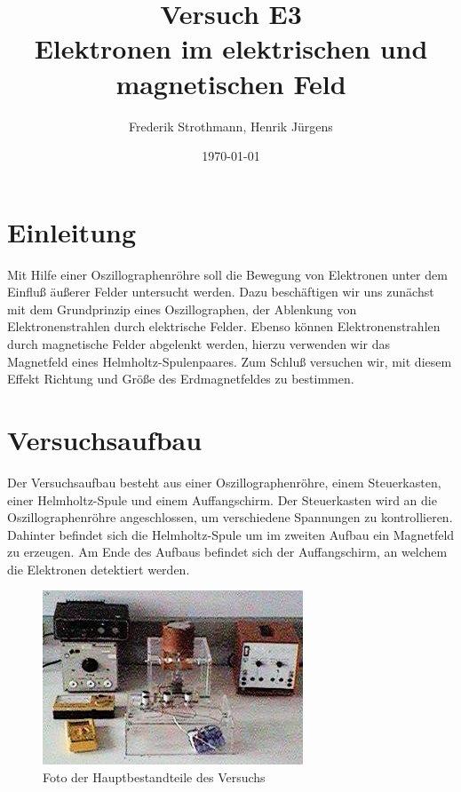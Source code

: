 \documentclass[12pt]{scrartcl}
\title{Versuch E3\\ Elektronen im elektrischen und magnetischen Feld}
\author{Frederik Strothmann, Henrik Jürgens}
\date{\today}
\begin{document}

\maketitle
\tableofcontents
\newpage


\section{Einleitung}
Mit Hilfe einer Oszillographenröhre soll die Bewegung von Elektronen unter dem Einfluß äußerer Felder untersucht werden. Dazu beschäftigen wir uns zunächst mit dem Grundprinzip eines Oszillographen, der Ablenkung von Elektronenstrahlen durch elektrische Felder. Ebenso können Elektronenstrahlen durch magnetische Felder abgelenkt werden, hierzu verwenden wir das Magnetfeld eines Helmholtz-Spulenpaares. Zum Schluß versuchen wir, mit diesem Effekt Richtung und Größe des Erdmagnetfeldes zu bestimmen.


\section{Versuchsaufbau}
Der Versuchsaufbau besteht aus einer Oszillographenröhre, einem Steuerkasten, einer Helmholtz-Spule und einem Auffangschirm.
Der Steuerkasten wird an die Oszillographenröhre angeschlossen, um verschiedene Spannungen zu kontrollieren. Dahinter befindet sich die Helmholtz-Spule um im zweiten Aufbau ein Magnetfeld zu erzeugen. Am Ende des Aufbaus befindet sich der Auffangschirm, an welchem die Elektronen detektiert werden.

\begin{figure}[htbp] 
  \centering
    \includegraphics[scale = 0.5]{aufbau.JPG}
  	\caption[Foto der Hauptbestandteile des Versuchs]{Foto der Hauptbestandteile des Versuchs\footnotemark}
  \label{fig:aufbau}
\end{figure}
\end{document}

